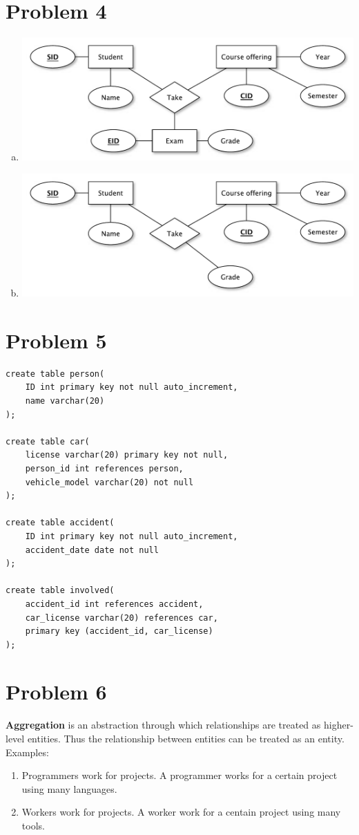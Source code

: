 \documentclass[a4paper,11pt]{article}
\begin{document}
\section*{Problem 4}
\begin{enumerate}[a)]
\item
\includegraphics[scale=0.4]{p4a}
\item 
\includegraphics[scale=0.4]{p4b}
\end{enumerate}

\section*{Problem 5}
\begin{lstlisting}
create table person(
	ID int primary key not null auto_increment,
	name varchar(20)
);

create table car(
	license varchar(20) primary key not null,
	person_id int references person,
	vehicle_model varchar(20) not null
);

create table accident(
	ID int primary key not null auto_increment,
	accident_date date not null
);

create table involved(
	accident_id int references accident,
	car_license varchar(20) references car,
	primary key (accident_id, car_license)
);
\end{lstlisting}

\section*{Problem 6}
\textbf{Aggregation} is an abstraction through which relationships are treated as higher-level entities. Thus the relationship between entities can be treated as an entity.\\

Examples:
\begin{enumerate}
\item Programmers work for projects. A programmer works for a certain project using many languages.
\item Workers work for projects. A worker work for a centain project using many tools.
\end{enumerate}
\end{document}
